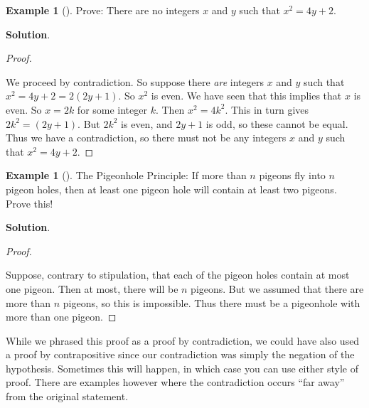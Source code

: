 \documentclass[10pt,]{book}
\theoremstyle{plain}
\theoremstyle{definition}
\theoremstyle{definition}
\newtheorem{example}[theorem]{Example}
\theoremstyle{definition}
\theoremstyle{definition}
\numberwithin{equation}{chapter}
\begin{document}
\begin{example}[]\label{example-70}
\hypertarget{p-2082}{}%
Prove: There are no integers \(x\) and \(y\) such that \(x^2  = 4y + 2\).%
\par\smallskip%
\noindent\textbf{Solution}.\hypertarget{solution-187}{}\quad%
\begin{proof}\hypertarget{proof-27}{}
\hypertarget{p-2083}{}%
We proceed by contradiction. So suppose there \emph{are} integers \(x\) and \(y\) such that \(x^2 = 4y + 2 = 2(2y + 1)\). So \(x^2\) is even. We have seen that this implies that \(x\) is even. So \(x = 2k\) for some integer \(k\). Then \(x^2 = 4k^2\). This in turn gives \(2k^2 = (2y + 1)\). But \(2k^2\) is even, and \(2y + 1\) is odd, so these cannot be equal. Thus we have a contradiction, so there must not be any integers \(x\) and \(y\) such that \(x^2 = 4y + 2\).%
\end{proof}
\end{example}
\begin{example}[]\label{example-71}
\hypertarget{p-2084}{}%
The Pigeonhole Principle: If more than \(n\) pigeons fly into \(n\) pigeon holes, then at least one pigeon hole will contain at least two pigeons. Prove this!%
\par\smallskip%
\noindent\textbf{Solution}.\hypertarget{solution-188}{}\quad%
\begin{proof}\hypertarget{proof-28}{}
\hypertarget{p-2085}{}%
Suppose, contrary to stipulation, that each of the pigeon holes contain at most one pigeon. Then at most, there will be \(n\) pigeons. But we assumed that there are more than \(n\) pigeons, so this is impossible. Thus there must be a pigeonhole with more than one pigeon.%
\end{proof}
\hypertarget{p-2086}{}%
While we phrased this proof as a proof by contradiction, we could have also used a proof by contrapositive since our contradiction was simply the negation of the hypothesis. Sometimes this will happen, in which case you can use either style of proof. There are examples however where the contradiction occurs ``far away'' from the original statement.%
\end{example}
\typeout{************************************************}
\typeout{************************************************}
\end{document}
